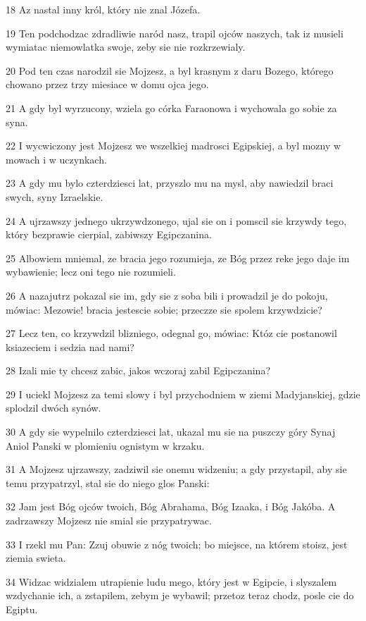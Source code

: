 \par 18 Az nastal inny król, który nie znal Józefa.
\par 19 Ten podchodzac zdradliwie naród nasz, trapil ojców naszych, tak iz musieli wymiatac niemowlatka swoje, zeby sie nie rozkrzewialy.
\par 20 Pod ten czas narodzil sie Mojzesz, a byl krasnym z daru Bozego, którego chowano przez trzy miesiace w domu ojca jego.
\par 21 A gdy byl wyrzucony, wziela go córka Faraonowa i wychowala go sobie za syna.
\par 22 I wycwiczony jest Mojzesz we wszelkiej madrosci Egipskiej, a byl mozny w mowach i w uczynkach.
\par 23 A gdy mu bylo czterdziesci lat, przyszlo mu na mysl, aby nawiedzil braci swych, syny Izraelskie.
\par 24 A ujrzawszy jednego ukrzywdzonego, ujal sie on i pomscil sie krzywdy tego, który bezprawie cierpial, zabiwszy Egipczanina.
\par 25 Albowiem mniemal, ze bracia jego rozumieja, ze Bóg przez reke jego daje im wybawienie; lecz oni tego nie rozumieli.
\par 26 A nazajutrz pokazal sie im, gdy sie z soba bili i prowadzil je do pokoju, mówiac: Mezowie! bracia jestescie sobie; przeczze sie spolem krzywdzicie?
\par 27 Lecz ten, co krzywdzil blizniego, odegnal go, mówiac: Któz cie postanowil ksiazeciem i sedzia nad nami?
\par 28 Izali mie ty chcesz zabic, jakos wczoraj zabil Egipczanina?
\par 29 I uciekl Mojzesz za temi slowy i byl przychodniem w ziemi Madyjanskiej, gdzie splodzil dwóch synów.
\par 30 A gdy sie wypelnilo czterdziesci lat, ukazal mu sie na puszczy góry Synaj Aniol Panski w plomieniu ognistym w krzaku.
\par 31 A Mojzesz ujrzawszy, zadziwil sie onemu widzeniu; a gdy przystapil, aby sie temu przypatrzyl, stal sie do niego glos Panski:
\par 32 Jam jest Bóg ojców twoich, Bóg Abrahama, Bóg Izaaka, i Bóg Jakóba. A zadrzawszy Mojzesz nie smial sie przypatrywac.
\par 33 I rzekl mu Pan: Zzuj obuwie z nóg twoich; bo miejsce, na którem stoisz, jest ziemia swieta.
\par 34 Widzac widzialem utrapienie ludu mego, który jest w Egipcie, i slyszalem wzdychanie ich, a zstapilem, zebym je wybawil; przetoz teraz chodz, posle cie do Egiptu.
